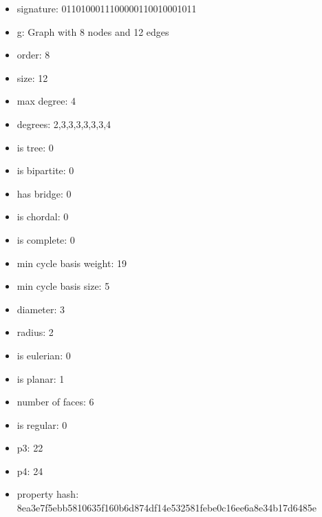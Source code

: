 \begin{itemize}
\item signature: 0110100011100000110010001011
\item g: Graph with 8 nodes and 12 edges
\item order: 8
\item size: 12
\item max degree: 4
\item degrees: 2,3,3,3,3,3,3,4
\item is tree: 0
\item is bipartite: 0
\item has bridge: 0
\item is chordal: 0
\item is complete: 0
\item min cycle basis weight: 19
\item min cycle basis size: 5
\item diameter: 3
\item radius: 2
\item is eulerian: 0
\item is planar: 1
\item number of faces: 6
\item is regular: 0
\item p3: 22
\item p4: 24
\item property hash: 8ea3e7f5ebb5810635f160b6d874df14e532581febe0c16ee6a8e34b17d6485e
\end{itemize}
\newpage
\begin{figure}
\end{figure}
